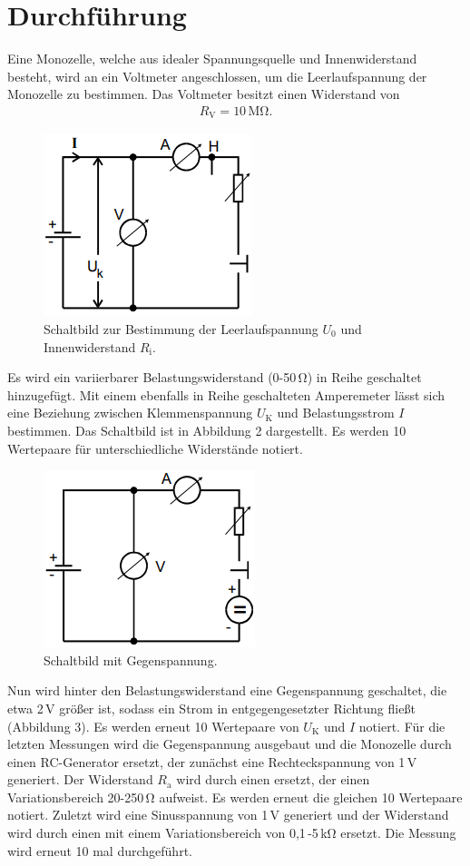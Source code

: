 \section{Durchführung}
\label{sec:Durchführung}

Eine Monozelle, welche aus idealer Spannungsquelle und Innenwiderstand besteht, wird
an ein Voltmeter angeschlossen, um die Leerlaufspannung der Monozelle zu  bestimmen. 
Das Voltmeter besitzt einen Widerstand von
\begin{align*}
R_\text{V} = 10\,\si{\mega\ohm}.
\end{align*}
\begin{figure}
  \centering
  \includegraphics{schalt2.png}
  \caption{Schaltbild zur Bestimmung der Leerlaufspannung $U_\text{0}$ und 
  Innenwiderstand $R_\text{i}$. \cite[S. 3]{l} }
  \label{fig:schaltung2}
\end{figure}
Es wird ein variierbarer Belastungswiderstand (0-50\,\si{\ohm}) in Reihe geschaltet hinzugefügt.
Mit einem ebenfalls in Reihe geschalteten Amperemeter lässt sich eine Beziehung zwischen
Klemmenspannung $U_\text{K}$ und Belastungsstrom $I$ bestimmen. Das Schaltbild ist in
Abbildung 2 dargestellt. Es werden 10 Wertepaare für unterschiedliche Widerstände notiert.
\begin{figure}
  \centering
  \includegraphics{schalt3.png}
  \caption{Schaltbild mit Gegenspannung. \cite[S. 3]{l} }
  \label{fig:schaltung3}
\end{figure}
Nun wird hinter den Belastungswiderstand eine Gegenspannung geschaltet, die etwa 2\,\si{\volt}
größer ist, sodass ein Strom in entgegengesetzter Richtung fließt (Abbildung 3).
Es werden erneut 10 Wertepaare von $U_\text{K}$ und $I$ notiert.
Für die letzten Messungen wird die Gegenspannung ausgebaut und die Monozelle durch einen
RC-Generator ersetzt, der zunächst eine Rechteckspannung von 1\,\si{\volt} generiert. Der Widerstand $R_\text{a}$ wird durch einen
ersetzt, der einen Variationsbereich 20-250\,\si{\ohm} aufweist. Es werden erneut die gleichen 10
Wertepaare notiert. Zuletzt wird eine Sinusspannung von 1\,\si{\volt} generiert und der Widerstand
wird durch einen mit einem Variationsbereich von 0,1\,-5\,\si{\kilo\ohm} ersetzt. Die Messung wird
erneut 10 mal durchgeführt.